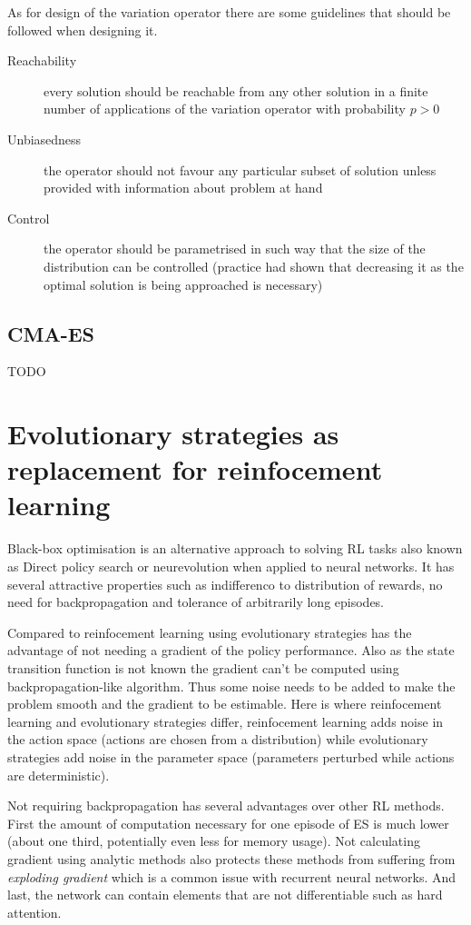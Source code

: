 As for design of the variation operator there are some guidelines that should be followed when designing it.
\begin{description}
    \item[Reachability] every solution should be reachable from any other solution in a finite number of applications of the variation operator with probability $p > 0$
    \item[Unbiasedness] the operator should not favour any particular subset of solution unless provided with information about problem at hand
    \item[Control] the operator should be parametrised in such way that the size of the distribution can be controlled (practice had shown that decreasing it as the optimal solution is being approached is necessary) 
\end{description}
\cite{Schwefel1995}
\cite{Rudolph2012}

\subsection{CMA-ES}
\label{subsec:cma-es}
TODO \cite{Hansen06}
\section{Evolutionary strategies as replacement for reinfocement learning}
\label{sec:es-reinf}

Black-box optimisation is an alternative approach to solving RL tasks also known as Direct policy search or neurevolution when applied to neural networks. It has several attractive properties such as indifferenco to distribution of rewards, no need for backpropagation and tolerance of arbitrarily long episodes.

Compared to reinfocement learning using evolutionary strategies has the advantage of not needing a gradient of the policy performance. Also as the state transition function is not known  the gradient can't be computed using backpropagation-like algorithm. Thus some noise needs to be added to make the problem smooth and the gradient to be estimable. Here is where reinfocement learning and evolutionary strategies differ, reinfocement learning adds noise in the action space (actions are chosen from a distribution) while evolutionary strategies add noise in the parameter space (parameters perturbed while actions are deterministic).

Not requiring backpropagation has several advantages over other RL methods. First the amount of computation necessary for one episode of ES is much lower (about one third, potentially even less for memory usage). Not calculating gradient using analytic methods also protects these methods from suffering from \emph{exploding gradient} which is a common issue with recurrent neural networks. And last, the network can contain elements that are not differentiable such as hard attention.


